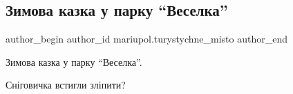  
 
 
 
 

\subsection{Зимова казка у парку \enquote{Веселка}}
\label{sec:26_12_2021.fb.mariupol.turystychne_misto.1.zymova_kazka_u_parku_veselka}

\ifcmt
 author_begin
   author_id mariupol.turystychne_misto
 author_end
\fi

Зимова казка у парку \enquote{Веселка}.

Сніговичка встигли зліпити?
